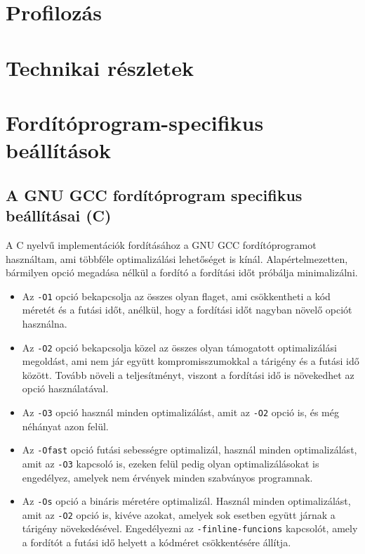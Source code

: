 
\section{Profilozás}
\section{Technikai részletek}
\section{Fordítóprogram-specifikus beállítások}
\subsection{A GNU GCC fordítóprogram specifikus beállításai (C)}
A C nyelvű implementációk fordításához a GNU GCC fordítóprogramot használtam, ami többféle optimalizálási lehetőséget is kínál. Alapértelmezetten, bármilyen opció megadása nélkül a fordító a fordítási időt próbálja minimalizálni.
\begin{itemize}
  \item Az \lstinline{-O1} opció bekapcsolja az összes olyan flaget, ami csökkentheti a kód méretét és a futási időt, anélkül, hogy a fordítási időt nagyban növelő opciót használna.
  \item Az \lstinline{-O2} opció bekapcsolja közel az összes olyan támogatott optimalizálási megoldást, ami nem jár együtt kompromisszumokkal a tárigény és a futási idő között. Tovább növeli a teljesítményt, viszont a fordítási idő is növekedhet az opció használatával.
  \item Az \lstinline{-O3} opció használ minden optimalizálást, amit az \lstinline{-O2} opció is, és még néhányat azon felül.
  \item Az \lstinline{-Ofast} opció futási sebességre optimalizál, használ minden optimalizálást, amit az \lstinline{-O3} kapcsoló is, ezeken felül pedig olyan optimalizálásokat is engedélyez, amelyek nem érvények minden szabványos programnak.
  \item Az \lstinline{-Os} opció a bináris méretére optimalizál. Használ minden optimalizálást, amit az \lstinline{-O2} opció is, kivéve azokat, amelyek sok esetben együtt járnak a tárigény növekedésével. Engedélyezni az \lstinline{-finline-funcions} kapcsolót, amely a fordítót a futási idő helyett a kódméret csökkentésére állítja. 
\end{itemize}
